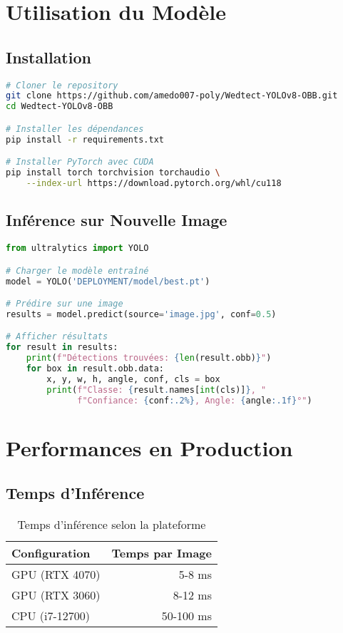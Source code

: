 \documentclass[a4paper,12pt]{report}
\begin{document}
\section{Utilisation du Modèle}

\subsection{Installation}

\begin{lstlisting}[language=bash]
# Cloner le repository
git clone https://github.com/amedo007-poly/Wedtect-YOLOv8-OBB.git
cd Wedtect-YOLOv8-OBB

# Installer les dépendances
pip install -r requirements.txt

# Installer PyTorch avec CUDA
pip install torch torchvision torchaudio \
    --index-url https://download.pytorch.org/whl/cu118
\end{lstlisting}

\subsection{Inférence sur Nouvelle Image}

\begin{lstlisting}[language=Python]
from ultralytics import YOLO

# Charger le modèle entraîné
model = YOLO('DEPLOYMENT/model/best.pt')

# Prédire sur une image
results = model.predict(source='image.jpg', conf=0.5)

# Afficher résultats
for result in results:
    print(f"Détections trouvées: {len(result.obb)}")
    for box in result.obb.data:
        x, y, w, h, angle, conf, cls = box
        print(f"Classe: {result.names[int(cls)]}, "
              f"Confiance: {conf:.2%}, Angle: {angle:.1f}°")
\end{lstlisting}

\section{Performances en Production}

\subsection{Temps d'Inférence}

\begin{table}[H]
    \centering
    \begin{tabular}{|l|r|}
    \hline
    \textbf{Configuration} & \textbf{Temps par Image} \\
    \hline
    GPU (RTX 4070) & 5-8 ms \\
    \hline
    GPU (RTX 3060) & 8-12 ms \\
    \hline
    CPU (i7-12700) & 50-100 ms \\
    \hline
    \end{tabular}
    \caption{Temps d'inférence selon la plateforme}
\end{table}
\end{document}
